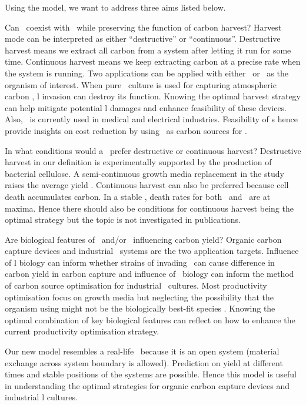\documentclass[../thesis.tex]{subfiles} %
\begin{document}
Using the model, we want to address three aims listed below.

Can \bac\ coexist with \phy\ while preserving the function of carbon harvest?  Harvest mode can be interpreted as either ``destructive” or ``continuous”.  Destructive harvest means we extract all carbon from a system after letting it run for some time.  Continuous harvest means we keep extracting carbon at a precise rate when the system is running.  Two applications can be applied with either \phy\ or \bac\ as the organism of interest.  When pure \phy\ culture is used for capturing atmospheric carbon \autocite{evanson_2019}, \bac l invasion can destroy its function.  Knowing the optimal harvest strategy can help mitigate potential \bac l damages and enhance feasibility of these devices.  Also, \bac\ is currently used in medical and electrical industries.  Feasibility of \pbs s hence provide insights on cost reduction by using \phy\ as carbon sources for \bac.

In what conditions would a \pbs\ prefer destructive or continuous harvest?  Destructive harvest in our definition is experimentally supported by the production of bacterial cellulose.  A semi-continuous growth media replacement in the study raises the average yield \autocite{aytekin2016statistical}.  Continuous harvest can also be preferred because cell death accumulates carbon.  In a stable \pbs, death rates for both \phy\ and \bac\ are at maxima.  Hence there should also be conditions for continuous harvest being the optimal strategy but the topic is not investigated in publications.

Are biological features of \phy\ and/or \bac\ influencing carbon yield?  Organic carbon capture devices and industrial \bac\ systems are the two application targets.  Influence of \bac l biology can inform whether strains of invading \bac\ can cause difference in carbon yield in carbon capture and influence of \phy\ biology can inform the method of carbon source optimisation for industrial \bac\ cultures.  Most productivity optimisation focus on growth media \autocite{dash2013marine,naik2013lead,huang2012industrial,evanson_2019} but neglecting the possibility that the organism using might not be the biologically best-fit species \autocite{huang2012industrial}.  Knowing the optimal combination of key biological features can reflect on how to enhance the current productivity optimisation strategy.

Our new model resembles a real-life \pbs\ because it is an open system (material exchange across system boundary is allowed).  Prediction on yield at different times and stable positions of the systems are possible.  Hence this model is useful in understanding the optimal strategies for organic carbon capture devices and industrial \bac l cultures.
\end{document}
